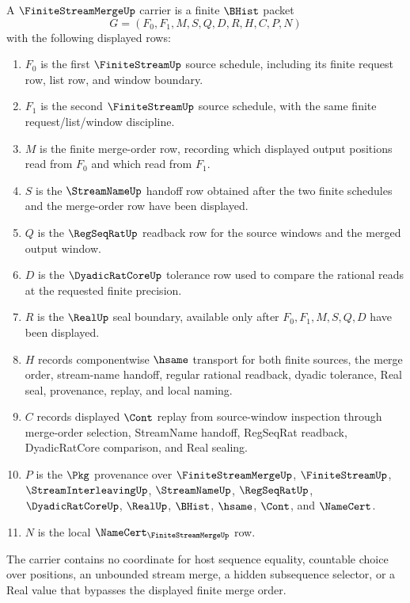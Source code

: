 \begin{definition}
\label{def:finite-stream-merge-carrier}
A $\FiniteStreamMergeUp$ carrier is a finite $\BHist$ packet
$$
G=(F_0,F_1,M,S,Q,D,R,H,C,P,N)
$$
with the following displayed rows:
\begin{enumerate}
\item $F_0$ is the first $\FiniteStreamUp$ source schedule, including its finite request row, list row, and window boundary.
\item $F_1$ is the second $\FiniteStreamUp$ source schedule, with the same finite request/list/window discipline.
\item $M$ is the finite merge-order row, recording which displayed output positions read from $F_0$ and which read from $F_1$.
\item $S$ is the $\StreamNameUp$ handoff row obtained after the two finite schedules and the merge-order row have been displayed.
\item $Q$ is the $\RegSeqRatUp$ readback row for the source windows and the merged output window.
\item $D$ is the $\DyadicRatCoreUp$ tolerance row used to compare the rational reads at the requested finite precision.
\item $R$ is the $\RealUp$ seal boundary, available only after $F_0,F_1,M,S,Q,D$ have been displayed.
\item $H$ records componentwise $\hsame$ transport for both finite sources, the merge order, stream-name handoff, regular rational readback, dyadic tolerance, Real seal, provenance, replay, and local naming.
\item $C$ records displayed $\Cont$ replay from source-window inspection through merge-order selection, StreamName handoff, RegSeqRat readback, DyadicRatCore comparison, and Real sealing.
\item $P$ is the $\Pkg$ provenance over $\FiniteStreamMergeUp$, $\FiniteStreamUp$, $\StreamInterleavingUp$, $\StreamNameUp$, $\RegSeqRatUp$, $\DyadicRatCoreUp$, $\RealUp$, $\BHist$, $\hsame$, $\Cont$, and $\NameCert$.
\item $N$ is the local $\NameCert_{\FiniteStreamMergeUp}$ row.
\end{enumerate}
The carrier contains no coordinate for host sequence equality, countable choice over positions, an unbounded stream merge, a hidden subsequence selector, or a Real value that bypasses the displayed finite merge order.
\end{definition}

